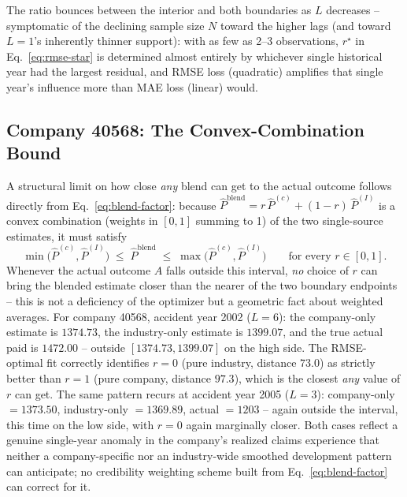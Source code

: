 \documentclass[11pt]{article}
\begin{document}
The ratio bounces between the interior and both boundaries as $L$ decreases -- symptomatic of the
declining sample size $N$ toward the higher lags (and toward $L=1$'s inherently thinner support):
with as few as 2--3 observations, $r^\star$ in Eq.~\eqref{eq:rmse-star} is determined almost
entirely by whichever single historical year had the largest residual, and RMSE loss (quadratic)
amplifies that single year's influence more than MAE loss (linear) would.

\subsection{Company 40568: The Convex-Combination Bound}
\label{sec:convex-bound}

A structural limit on how close \emph{any} blend can get to the actual outcome follows directly
from Eq.~\eqref{eq:blend-factor}: because $\widehat{P}^{\text{blend}} = r\,\widehat{P}^{(c)} +
(1-r)\,\widehat{P}^{(I)}$ is a convex combination (weights in $[0,1]$ summing to 1) of the two
single-source estimates, it must satisfy
\begin{equation}
\min\bigl(\widehat{P}^{(c)}, \widehat{P}^{(I)}\bigr) \;\le\; \widehat{P}^{\text{blend}} \;\le\;
\max\bigl(\widehat{P}^{(c)}, \widehat{P}^{(I)}\bigr) \qquad \text{for every } r \in [0,1].
\label{eq:convex-bound}
\end{equation}
Whenever the actual outcome $A$ falls outside this interval, \emph{no} choice of $r$ can bring
the blended estimate closer than the nearer of the two boundary endpoints -- this is not a
deficiency of the optimizer but a geometric fact about weighted averages. For company 40568,
accident year 2002 ($L=6$): the company-only estimate is $1374.73$, the industry-only estimate is
$1399.07$, and the true actual paid is $1472.00$ -- outside $[1374.73,1399.07]$ on the high side.
The RMSE-optimal fit correctly identifies $r=0$ (pure industry, distance $73.0$) as strictly
better than $r=1$ (pure company, distance $97.3$), which is the closest \emph{any} value of $r$
can get. The same pattern recurs at accident year 2005 ($L=3$): company-only $=1373.50$,
industry-only $=1369.89$, actual $=1203$ -- again outside the interval, this time on the low side,
with $r=0$ again marginally closer. Both cases reflect a genuine single-year anomaly in the
company's realized claims experience that neither a company-specific nor an industry-wide smoothed
development pattern can anticipate; no credibility weighting scheme built from Eq.~\eqref{eq:blend-factor}
can correct for it.
\end{document}
